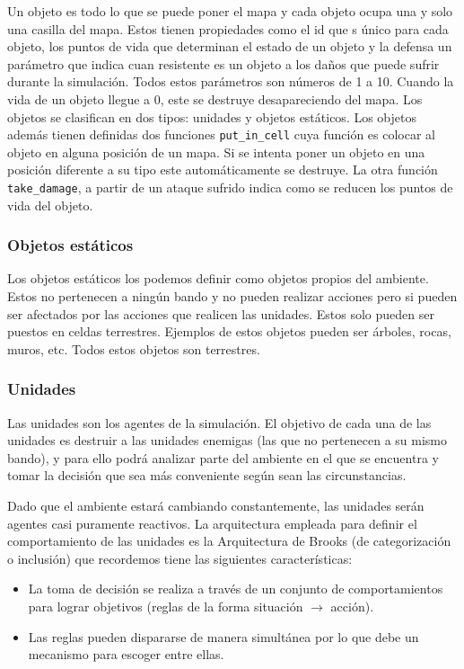Un objeto es todo lo que se puede poner el mapa y cada objeto ocupa una y solo una casilla del mapa. Estos tienen propiedades como el id que s único para cada objeto, los puntos de vida que determinan el estado de un objeto y la defensa un parámetro que indica cuan resistente es un objeto a los daños que puede sufrir durante la simulación. Todos estos parámetros son números de 1 a 10. Cuando la vida de un objeto llegue a 0, este se destruye desapareciendo del mapa. Los objetos se clasifican en dos tipos: unidades y objetos estáticos. Los objetos además tienen definidas dos funciones \verb|put_in_cell| cuya función es colocar al objeto en alguna posición de un mapa. Si se intenta poner un objeto en una posición diferente a su tipo este automáticamente se destruye. La otra función \verb|take_damage|, a partir de un ataque sufrido indica como se reducen los puntos de vida del objeto.

\subsubsection{Objetos estáticos}

Los objetos estáticos los podemos definir como objetos propios del ambiente. Estos no pertenecen a ningún bando y no pueden realizar acciones pero si pueden ser afectados por las acciones que realicen las unidades. Estos solo pueden ser puestos en celdas terrestres. Ejemplos de estos objetos pueden ser árboles, rocas, muros, etc. Todos estos objetos son terrestres. 

\subsubsection{Unidades}

Las unidades son los agentes de la simulación. El objetivo de cada una de las unidades es destruir a las unidades enemigas (las que no pertenecen a su mismo bando), y para ello podrá analizar parte del ambiente en el que se encuentra y tomar la decisión que sea más conveniente según sean las circunstancias. 

Dado que el ambiente estará cambiando constantemente, las unidades serán agentes casi puramente reactivos. La arquitectura empleada para definir el comportamiento de las unidades es la Arquitectura de Brooks (de categorización o inclusión) que recordemos tiene las siguientes características: 

\begin{itemize}
	\item La toma de decisión se realiza a través de un conjunto de comportamientos para lograr objetivos (reglas de la forma situación $\rightarrow$ acción).
	\item Las reglas pueden dispararse de manera simultánea por lo que debe un mecanismo para escoger entre ellas.	
\end{itemize}

